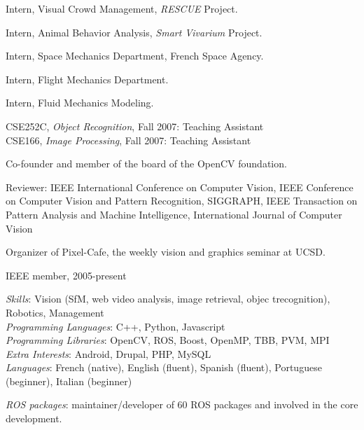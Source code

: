 \begin{llist}
Intern, Visual Crowd Management, {\em RESCUE} Project.

Intern, Animal Behavior Analysis, {\em Smart Vivarium} Project.

Intern, Space Mechanics Department, French Space Agency.

 
Intern, Flight Mechanics Department.

 
Intern, Fluid Mechanics Modeling.

CSE252C, {\em Object Recognition}, Fall 2007: Teaching Assistant\\
CSE166, {\em Image Processing}, Fall 2007: Teaching Assistant


Co-founder and member of the board of the OpenCV foundation.

Reviewer: IEEE International Conference on Computer Vision, IEEE Conference on Computer Vision and Pattern Recognition, 
SIGGRAPH, IEEE Transaction on Pattern Analysis and Machine Intelligence, International Journal of Computer Vision

Organizer of Pixel-Cafe, the weekly vision and graphics seminar at UCSD.

IEEE member, 2005-present

{\em Skills}: Vision (SfM, web video analysis, image retrieval, objec trecognition), Robotics, Management \\
{\em Programming Languages}: C++, Python, Javascript \\
{\em Programming Libraries}: OpenCV, ROS, Boost, OpenMP, TBB, PVM, MPI \\
{\em Extra Interests}: Android, Drupal, PHP, MySQL \\
{\em Languages}: French (native), English (fluent), Spanish (fluent), Portuguese (beginner), Italian (beginner)

{\em ROS packages}: maintainer/developer of 60 ROS packages and involved in the core development.


\end{llist}
